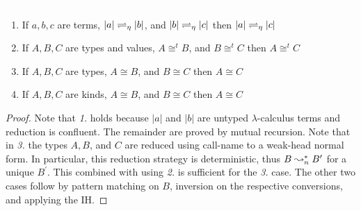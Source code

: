 \begin{lemma}
    \label{lem:4:c1_trans}
    \textcolor{white}{\_}
    \begin{enumerate}
        \item If $a, b, c$ are terms, $|a| \rightleftharpoons_\eta |b|$, and $|b| \rightleftharpoons_\eta |c|$ then $|a| \rightleftharpoons_\eta |c|$
        \item If $A, B, C$ are types and values, $A \cong^t B$, and $B \cong^t C$ then $A \cong^t C$
        \item If $A, B, C$ are types, $A \cong B$, and $B \cong C$ then $A \cong C$
        \item If $A, B, C$ are kinds, $A \cong B$, and $B \cong C$ then $A \cong C$
    \end{enumerate}
\end{lemma}
\begin{proof}
    Note that \textit{1.} holds because $|a|$ and $|b|$ are untyped $\lambda$-calculus terms and reduction is confluent.
    The remainder are proved by mutual recursion.
    Note that in \textit{3.} the types $A, B$, and $C$ are reduced using call-name to a weak-head normal form.
    In particular, this reduction strategy is deterministic, thus $B \leadsto^*_n B^\prime$ for a unique $B^\prime$.
    This combined with using \textit{2.} is sufficient for the \textit{3.} case.
    The other two cases follow by pattern matching on $B$, inversion on the respective conversions, and applying the IH.
\end{proof}




